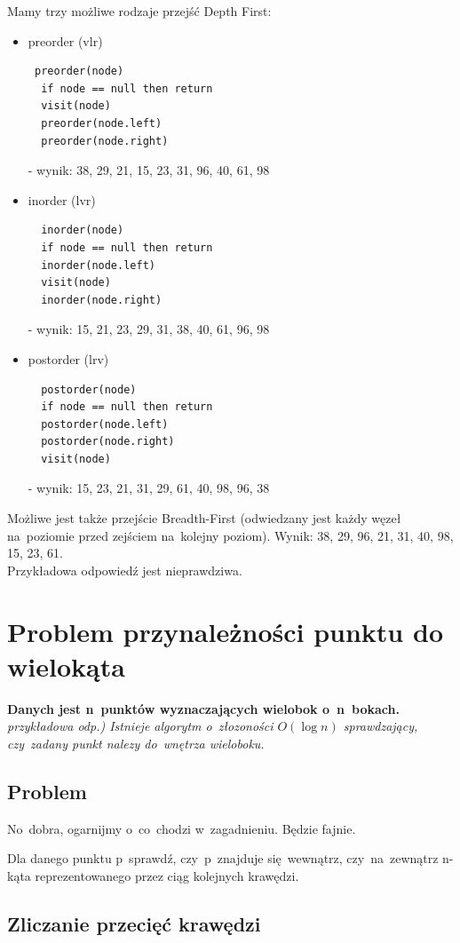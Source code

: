 Mamy trzy możliwe rodzaje przejść Depth First:
\begin{itemize}
 \item preorder (vlr) 
 \begin{lstlisting}
 preorder(node)
  if node == null then return
  visit(node)
  preorder(node.left) 
  preorder(node.right)
 \end{lstlisting}
 - wynik:  38, 29, 21, 15, 23, 31, 96, 40, 61, 98
 \item inorder (lvr) 
 \begin{lstlisting}
  inorder(node)
  if node == null then return
  inorder(node.left)
  visit(node)
  inorder(node.right)
 \end{lstlisting}
- wynik: 15, 21, 23, 29, 31, 38, 40, 61, 96, 98
 \item postorder (lrv)
 \begin{lstlisting}
  postorder(node)
  if node == null then return
  postorder(node.left)
  postorder(node.right)
  visit(node)
 \end{lstlisting}
- wynik: 15, 23, 21, 31, 29, 61, 40, 98, 96, 38
\end{itemize}

Możliwe jest także przejście Breadth-First (odwiedzany jest każdy węzeł na~poziomie przed zejściem na~kolejny poziom). Wynik: 38, 29, 96, 21, 31, 40, 98, 15, 23, 61.\\
Przykładowa odpowiedź jest nieprawdziwa.

\section{Problem przynależności punktu do wielokąta}

\textbf{Danych jest n~punktów wyznaczających wielobok o~n~bokach.}\\
\textit{przykładowa odp.) Istnieje algorytm o~złozoności $O(\log n)$ sprawdzający, czy~zadany punkt nalezy do~wnętrza wieloboku.}

\vspace{0.4cm}

\subsection{Problem}
No~dobra, ogarnijmy o~co~chodzi w~zagadnieniu. Będzie fajnie.

Dla danego punktu p~sprawdź, czy~p~znajduje się~wewnątrz, czy~na~zewnątrz n-kąta reprezentowanego przez ciąg kolejnych krawędzi.
\subsection{Zliczanie przecięć krawędzi}

